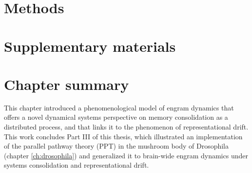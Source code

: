 \section{Methods}


\section{Supplementary materials}


\section{Chapter summary}
This chapter introduced a phenomenological model of engram dynamics that offers a novel dynamical systems perspective on memory consolidation as a distributed process, and that links it to the phenomenon of representational drift. This work concludes Part III of this thesis, which illustrated an implementation of the parallel pathway theory (PPT) in the mushroom body of Drosophila (chapter \ref{ch:drosophila}) and generalized it to brain-wide engram dynamics under systems consolidation and representational drift.

